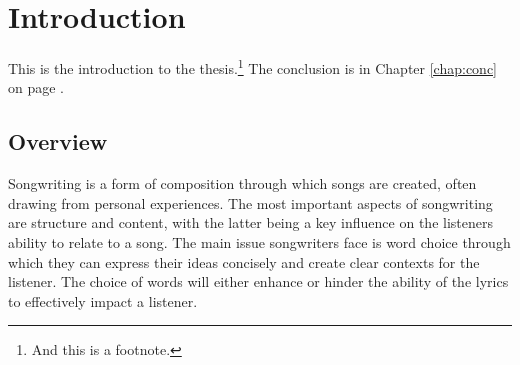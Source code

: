 \chapter{Introduction}
\label{chap:intro}

This is the introduction to the thesis.\footnote{And this is a footnote.}  The conclusion is in Chapter \ref{chap:conc} on page \pageref{chap:conc}.

\section{Overview}
Songwriting is a form of composition through which songs are created, often drawing from personal experiences. The most important aspects of songwriting are structure and content, with the latter being a key influence on the listeners ability to relate to a song. The main issue songwriters face is word choice through which they can express their ideas concisely and create clear contexts for the listener. The choice of words will either enhance or hinder the ability of the lyrics to effectively impact a listener.
